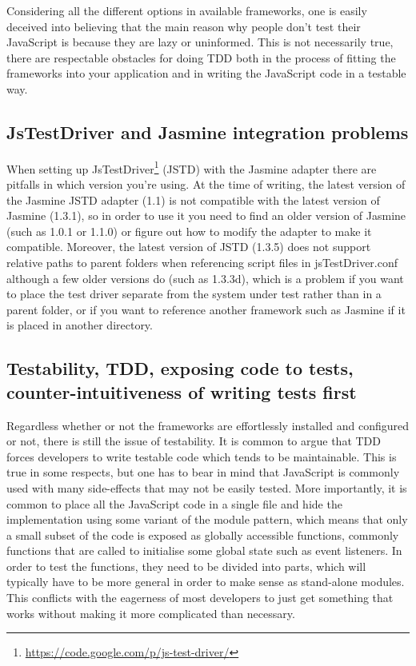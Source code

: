 \documentclass[11pt]{article}
\begin{document}
Considering all the different options in available frameworks, one is easily deceived into believing that the main reason why people don't test their JavaScript is because they are lazy or uninformed. This is not necessarily true, there are respectable obstacles for doing TDD both in the process of fitting the frameworks into your application and in writing the JavaScript code in a testable way.

\subsection{JsTestDriver and Jasmine integration problems}

When setting up JsTestDriver\footnote{\url{https://code.google.com/p/js-test-driver/}} (JSTD) with the Jasmine adapter there are pitfalls in which version you're using. At the time of writing, the latest version of the Jasmine JSTD adapter (1.1) is not compatible with the latest version of Jasmine (1.3.1), so in order to use it you need to find an older version of Jasmine (such as 1.0.1 or 1.1.0) or figure out how to modify the adapter to make it compatible. Moreover, the latest version of JSTD (1.3.5) does not support relative paths to parent folders when referencing script files in jsTestDriver.conf although a few older versions do (such as 1.3.3d), which is a problem if you want to place the test driver separate from the system under test rather than in a parent folder, or if you want to reference another framework such as Jasmine if it is placed in another directory.

\subsection{Testability, TDD, exposing code to tests, counter-intuitiveness of writing tests first}

Regardless whether or not the frameworks are effortlessly installed and configured or not, there is still the issue of testability. It is common to argue that TDD forces developers to write testable code which tends to be maintainable. This is true in some respects, but one has to bear in mind that JavaScript is commonly used with many side-effects that may not be easily tested. More importantly, it is common to place all the JavaScript code in a single file and hide the implementation using some variant of the module pattern\cite[p.~40]{GoodParts}, which means that only a small subset of the code is exposed as globally accessible functions, commonly functions that are called to initialise some global state such as event listeners. In order to test the functions, they need to be divided into parts, which will typically have to be more general in order to make sense as stand-alone modules. This conflicts with the eagerness of most developers to just get something that works without making it more complicated than necessary.
\end{document}
